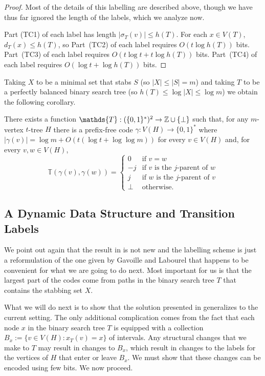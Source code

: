 \documentclass[kpfonts]{patmorin}
\begin{document}
\begin{proof}
  Most of the details of this labelling are described above, though we have thus far ignored the length of the labels, which we analyze now.
  
  Part (TC1) of each label has length $|\sigma_T(v)|\le h(T)$.  For each $x\in V(T)$, $d_T(x)\le h(T)$, so Part~(TC2) of each label requires $O(t\log h(T))$ bits.  Part~(TC3) of each label requires $O(t\log t + t\log h(T))$ bits.  Part~(TC4) of each label requires $O(\log t + \log h(T))$ bits.
\end{proof}

Taking $X$ to be a minimal set that stabs $S$ (so $|X|\le |S|=m$) and taking $T$ to be a perfectly balanced binary search tree (so $h(T)\le \log|X|\le\log m$) we obtain the following corollary.

\begin{cor}
  There exists a function $\mathds{T}:(\{0,1\}^*)^2\to \Z\cup\{\perp\}$ such that, for any $m$-vertex $t$-tree $H$ there is a prefix-free code $\gamma:V(H)\to\{0,1\}^*$ where $|\gamma(v)|=\log m + O(t(\log t + \log\log m))$ for every $v\in V(H)$ and, for every $v,w\in V(H)$, 
  \[
      \mathds{T}(\gamma(v),\gamma(w)) = \begin{cases}
      0 & \text{if $v=w$} \\
      -j & \text{if $v$ is the $j$-parent of $w$} \\
      j & \text{if $w$ is the $j$-parent of $v$} \\
      \perp & \text{otherwise.}
    \end{cases}
  \]
\end{cor}


\subsection{A Dynamic Data Structure and Transition Labels}

We point out again that the result in  is not new and the labelling scheme is just a reformulation of the one given by Gavoille and Labourel \cite{gavoille.labourel:shorter} that happens to be convenient for what we are going to do next. Most important for us is that the largest part of the codes come from paths in the binary search tree $T$ that contains the stabbing set $X$.  

What we will do next is to show that the solution presented in  generalizes to the current setting.  The only additional complication comes from the fact that each node $x$ in the binary search tree $T$ is equipped with a collection $B_x:=\{v\in V(H):x_T(v)=x\}$ of intervals.  Any structural changes that we make to $T$ may result in changes to $B_x$, which result in changes to the labels for the vertices of $H$ that enter or leave $B_x$.  We must show that these changes can be encoded using few bits.  We now proceed.
\end{document}
